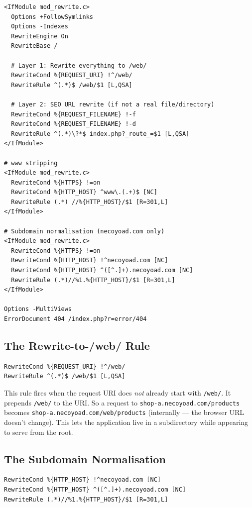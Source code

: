 \documentclass[11pt,a4paper]{article}
\begin{document}
\begin{lstlisting}[caption={Root .htaccess --- the rewrite rules (abridged).},label={lst:root-htaccess}]
<IfModule mod_rewrite.c>
  Options +FollowSymlinks
  Options -Indexes
  RewriteEngine On
  RewriteBase /

  # Layer 1: Rewrite everything to /web/
  RewriteCond %{REQUEST_URI} !^/web/
  RewriteRule ^(.*)$ /web/$1 [L,QSA]

  # Layer 2: SEO URL rewrite (if not a real file/directory)
  RewriteCond %{REQUEST_FILENAME} !-f
  RewriteCond %{REQUEST_FILENAME} !-d
  RewriteRule ^(.*)\?*$ index.php?_route_=$1 [L,QSA]
</IfModule>

# www stripping
<IfModule mod_rewrite.c>
  RewriteCond %{HTTPS} !=on
  RewriteCond %{HTTP_HOST} ^www\.(.+)$ [NC]
  RewriteRule (.*) //%{HTTP_HOST}/$1 [R=301,L]
</IfModule>

# Subdomain normalisation (necoyoad.com only)
<IfModule mod_rewrite.c>
  RewriteCond %{HTTPS} !=on
  RewriteCond %{HTTP_HOST} !^necoyoad.com [NC]
  RewriteCond %{HTTP_HOST} ^([^.]+).necoyoad.com [NC]
  RewriteRule (.*)//%1.%{HTTP_HOST}/$1 [R=301,L]
</IfModule>

Options -MultiViews
ErrorDocument 404 /index.php?r=error/404
\end{lstlisting}

\subsection{The Rewrite-to-/web/ Rule}

\begin{lstlisting}[language={},basicstyle=\ttfamily\small,numbers=none,frame=none]
RewriteCond %{REQUEST_URI} !^/web/
RewriteRule ^(.*)$ /web/$1 [L,QSA]
\end{lstlisting}

This rule fires when the request URI does \emph{not} already start with
\texttt{/web/}. It prepends \texttt{/web/} to the URI. So a request to
\texttt{shop-a.necoyoad.com/products} becomes
\texttt{shop-a.necoyoad.com/web/products} (internally --- the browser
URL doesn't change). This lets the application live in a subdirectory
while appearing to serve from the root.

\subsection{The Subdomain Normalisation}

\begin{lstlisting}[language={},basicstyle=\ttfamily\small,numbers=none,frame=none]
RewriteCond %{HTTP_HOST} !^necoyoad.com [NC]
RewriteCond %{HTTP_HOST} ^([^.]+).necoyoad.com [NC]
RewriteRule (.*)//%1.%{HTTP_HOST}/$1 [R=301,L]
\end{lstlisting}
\end{document}
